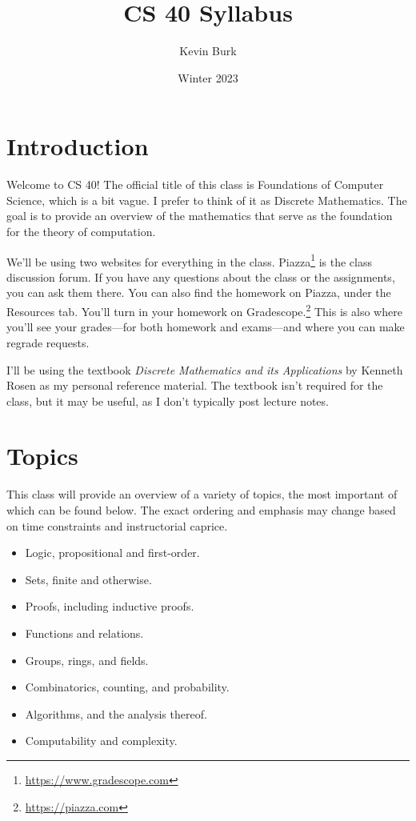 \documentclass{article}
\title{CS 40 Syllabus}
\author{Kevin Burk}
\date{Winter 2023}
\begin{document}
\maketitle

\section{Introduction}

Welcome to CS 40!
The official title of this class is Foundations of Computer Science, which is a bit vague.
I prefer to think of it as Discrete Mathematics.
The goal is to provide an overview of the mathematics that serve as the foundation for the theory of computation.

We'll be using two websites for everything in the class.
Piazza\footnote{\url{https://www.gradescope.com}} is the class discussion forum.
If you have any questions about the class or the assignments, you can ask them there.
You can also find the homework on Piazza, under the Resources tab.
You'll turn in your homework on Gradescope.\footnote{\url{https://piazza.com}}
This is also where you'll see your grades---for both homework and exams---and where you can make regrade requests.

I'll be using the textbook \textit{Discrete Mathematics and its Applications} by Kenneth Rosen as my personal reference material.
The textbook isn't required for the class, but it may be useful, as I don't typically post lecture notes.


\section{Topics}

This class will provide an overview of a variety of topics, the most important of which can be found below.
The exact ordering and emphasis may change based on time constraints and instructorial caprice.

\begin{itemize}
    \setlength\itemsep{0em}
    \item Logic, propositional and first-order.
    \item Sets, finite and otherwise.
    \item Proofs, including inductive proofs.
    \item Functions and relations.
    \item Groups, rings, and fields.
    \item Combinatorics, counting, and probability.
    \item Algorithms, and the analysis thereof.
    \item Computability and complexity.
\end{itemize}
\end{document}
